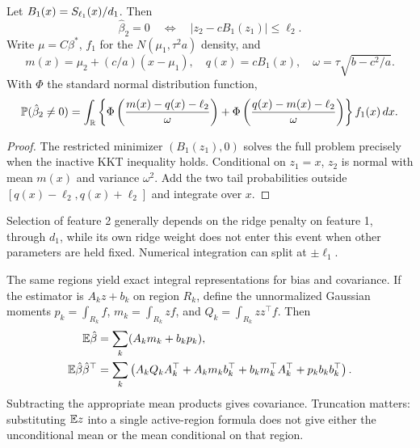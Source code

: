 \begin{proposition}
 \label{prop:selection}
 Let $B_1(x) = S_{\ell_1}(x)/d_1$. Then
 \begin{equation}
  \label{eq:inactive}
  \hat\beta_2 = 0\quad \Longleftrightarrow \quad |z_2 - cB_1(z_1)| \le \ell_2.
 \end{equation}
 Write $\mu = C\beta^*$, $f_1$ for the $N(\mu_1,\tau^2a)$ density, and
 \[
  m(x) = \mu_2 + (c/a)(x - \mu_1),\quad q(x)
       = cB_1(x),\quad \omega
       = \tau\sqrt{b - c^2/a}.
 \]
 With $\Phi$ the standard normal distribution function,
 \begin{equation}
  \label{eq:selection}
  \mathbb{P}(\hat\beta_2 \ne 0) = \int_{\mathbb{R}} \left\{ \Phi\left( \frac{m(x) - q(x) - \ell_2}{\omega} \right) + \Phi\left( \frac{q(x) - m(x) - \ell_2}{\omega} \right) \right\}f_1(x)\,dx.
 \end{equation}
\end{proposition}
\begin{proof}
 The restricted minimizer $(B_1(z_1),0)$ solves the full problem precisely when
 the inactive KKT inequality holds. Conditional on $z_1 = x$, $z_2$ is normal
 with mean $m(x)$ and variance $\omega^2$. Add the two tail probabilities
 outside $[q(x) - \ell_2,q(x) + \ell_2]$ and integrate over $x$.
\end{proof}
Selection of feature 2 generally depends on the ridge penalty on feature 1,
through $d_1$, while its own ridge weight does not enter this event when other
parameters are held fixed. Numerical integration can split at $\pm\ell_1$.

The same regions yield exact integral representations for bias and covariance.
If the estimator is $A_kz + b_k$ on region $R_k$, define the unnormalized
Gaussian moments $p_k = \int_{R_k}f$, $m_k = \int_{R_k}zf$, and
$Q_k = \int_{R_k}zz^\top f$. Then
\begin{align}
 \mathbb{E}\hat\beta               & = \sum_k(A_km_k + b_kp_k),\label{eq:mean-regions}                                               \\
 \mathbb{E}\hat\beta\hat\beta^\top & = \sum_k\left( A_kQ_kA_k^\top + A_km_kb_k^\top + b_km_k^\top A_k^\top + p_kb_kb_k^\top \right).
\end{align}
Subtracting the appropriate mean products gives covariance. Truncation matters:
substituting $\mathbb{E} z$ into a single active-region formula does not give either the
unconditional mean or the mean conditional on that region.

